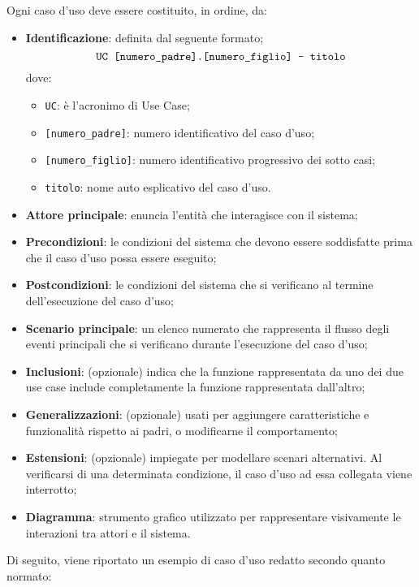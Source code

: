     \noindent
    Ogni caso d'uso deve essere costituito, in ordine, da:
        \begin{itemize}
            \item \textbf{Identificazione}: definita dal seguente formato;
            $$\text{\texttt{UC [numero\_padre].[numero\_figlio] - titolo}}$$
            dove:
                \begin{itemize}
                    \item \texttt{UC}: è l'acronimo di Use Case;
                    \item \texttt{[numero\_padre]}: numero identificativo del caso d'uso;
                    \item \texttt{[numero\_figlio]}: numero identificativo progressivo dei sotto casi;
                    \item \texttt{titolo}: nome auto esplicativo del caso d'uso.
                \end{itemize}
            \item \textbf{Attore principale}: enuncia l'entità che interagisce con il sistema;
            \item \textbf{Precondizioni}: le condizioni del sistema che devono essere soddisfatte prima che il caso d'uso possa essere eseguito;
            \item \textbf{Postcondizioni}: le condizioni del sistema che si verificano al termine dell'esecuzione del caso d'uso;
            \item \textbf{Scenario principale}: un elenco numerato che rappresenta il flusso degli eventi principali che si verificano durante l'esecuzione del caso d'uso;
            \item \textbf{Inclusioni}: (opzionale) indica che la funzione rappresentata da uno dei due use case include completamente la funzione rappresentata dall'altro;
            \item \textbf{Generalizzazioni}: (opzionale) usati per aggiungere caratteristiche e funzionalità rispetto ai padri, o modificarne il comportamento;
            \item \textbf{Estensioni}: (opzionale) impiegate per modellare scenari alternativi. Al verificarsi di una determinata condizione, il caso d'uso ad essa collegata viene interrotto;
            \item \textbf{Diagramma}: strumento grafico utilizzato per rappresentare visivamente le interazioni tra attori e il sistema. 
        \end{itemize}
        \noindent Di seguito, viene riportato un esempio di caso d'uso redatto secondo quanto normato:
